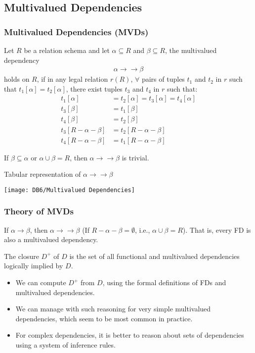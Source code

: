 \subsection{Multivalued Dependencies}
\subsubsection{Multivalued Dependencies (MVDs)}
\begin{definition}
    Let $R$ be a relation schema and let $\alpha \subseteq R$ and $\beta \subseteq R$, the multivalued dependency 
    \begin{align*}
        \alpha \rightarrow \rightarrow \beta
    \end{align*}
    holds on $R$, if in any legal relation $r(R)$, $\forall$ pairs of tuples $t_1$ and $t_2$ in $r$ such that $t_1[\alpha]=t_2[\alpha]$, there exist tuples $t_3$ and $t_4$ in $r$ such that: 
    \begin{align*}
        t_1[\alpha]&=t_2[\alpha]=t_3[\alpha]=t_4[\alpha]\\
        t_3[\beta]&=t_1[\beta]\\
        t_4[\beta]&=t_2[\beta]\\
        t_3[R-\alpha-\beta]&=t_2[R-\alpha-\beta]\\
        t_4[R-\alpha-\beta]&=t_1[R-\alpha-\beta]
    \end{align*}
\end{definition}

If $\beta \subseteq \alpha$ or $\alpha \cup \beta=R$, then $\alpha\rightarrow\rightarrow\beta$ is trivial. 

\begin{table}[H]
    \centering
    \caption{Tabular representation of $\alpha\rightarrow\rightarrow\beta$}
    \texttt{[image: DB6/Multivalued Dependencies]}
\end{table}

\subsubsection{Theory of MVDs}
If $\alpha\rightarrow\beta$, then $\alpha\rightarrow\rightarrow\beta$ (If $R-\alpha-\beta=\emptyset$, i.e., $\alpha\cup \beta=R$). That is, every FD is also a multivalued dependency.

The closure $D^+$ of $D$ is the set of all functional and multivalued dependencies logically implied by $D$.
\begin{itemize}\small
    \item We can compute $D^+$ from $D$, using the formal definitions of FDs and multivalued dependencies.
    \item We can manage with such reasoning for very simple multivalued dependencies, which seem to be most common in practice.
    \item For complex dependencies, it is better to reason about sets of dependencies using a system of inference rules. 
\end{itemize}

